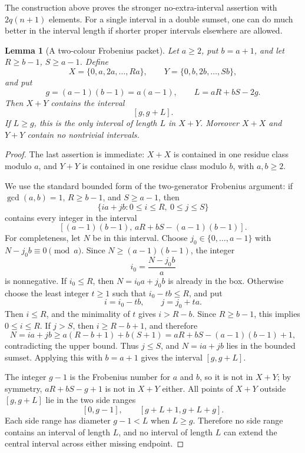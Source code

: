 \documentclass[11pt]{article}
\newtheorem{lemma}{Lemma}
\begin{document}
The construction above proves the stronger no-extra-interval assertion with
$2q(n+1)$ elements. For a single interval in a double sumset, one can do much
better in the interval length if shorter proper intervals elsewhere are
allowed.

\begin{lemma}[A two-colour Frobenius packet]\label{lem:frobenius-packet}
Let $a\geq 2$, put $b=a+1$, and let $R\geq b-1$, $S\geq a-1$. Define
\[
 X=\{0,a,2a,\ldots,Ra\},
 \qquad
 Y=\{0,b,2b,\ldots,Sb\},
\]
and put
\[
 g=(a-1)(b-1)=a(a-1),
 \qquad
 L=aR+bS-2g.
\]
Then $X+Y$ contains the interval
\[
 [g,g+L].
\]
If $L\geq g$, this is the only interval of length $L$ in $X+Y$. Moreover
$X+X$ and $Y+Y$ contain no nontrivial intervals.
\end{lemma}

\begin{proof}
The last assertion is immediate: $X+X$ is contained in one residue class
modulo $a$, and $Y+Y$ is contained in one residue class modulo $b$, with
$a,b\geq 2$.

We use the standard bounded form of the two-generator Frobenius argument: if
$\gcd(a,b)=1$, $R\geq b-1$, and $S\geq a-1$, then
\[
 \{ia+jb:0\leq i\leq R,\ 0\leq j\leq S\}
\]
contains every integer in the interval
\[
 [(a-1)(b-1),\,aR+bS-(a-1)(b-1)].
\]
For completeness, let $N$ be in this interval. Choose
$j_0\in\{0,\ldots,a-1\}$ with $N-j_0b\equiv0\pmod a$. Since
$N\geq(a-1)(b-1)$, the integer
\[
 i_0=\frac{N-j_0b}{a}
\]
is nonnegative. If $i_0\leq R$, then $N=i_0a+j_0b$ is already in the box.
Otherwise choose the least integer $t\geq1$ such that
$i_0-tb\leq R$, and put
\[
 i=i_0-tb,\qquad j=j_0+ta.
\]
Then $i\leq R$, and the minimality of $t$ gives $i>R-b$. Since
$R\geq b-1$, this implies $0\leq i\leq R$. If $j>S$, then
$i\geq R-b+1$, and therefore
\[
 N=ia+jb\geq a(R-b+1)+b(S+1)
 =aR+bS-(a-1)(b-1)+1,
\]
contradicting the upper bound. Thus $j\leq S$, and $N=ia+jb$ lies in the
bounded sumset. Applying this with $b=a+1$ gives the interval $[g,g+L]$.

The integer $g-1$ is the Frobenius number for $a$ and $b$, so it is not in
$X+Y$; by symmetry, $aR+bS-g+1$ is not in $X+Y$ either. All points of $X+Y$
outside $[g,g+L]$ lie in the two side ranges
\[
 [0,g-1],
 \qquad
 [g+L+1,g+L+g].
\]
Each side range has diameter $g-1<L$ when $L\geq g$. Therefore no side range
contains an interval of length $L$, and no interval of length $L$ can extend
the central interval across either missing endpoint.
\end{proof}
\end{document}
